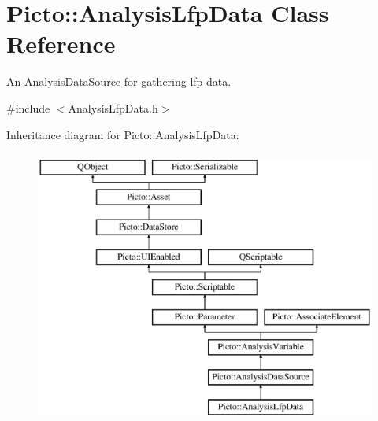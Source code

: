\hypertarget{class_picto_1_1_analysis_lfp_data}{\section{Picto\-:\-:Analysis\-Lfp\-Data Class Reference}
\label{class_picto_1_1_analysis_lfp_data}
}


An \hyperlink{class_picto_1_1_analysis_data_source}{Analysis\-Data\-Source} for gathering lfp data.  




{\ttfamily \#include $<$Analysis\-Lfp\-Data.\-h$>$}

Inheritance diagram for Picto\-:\-:Analysis\-Lfp\-Data\-:\begin{figure}[H]
\begin{center}
\leavevmode
\includegraphics[height=9.000000cm]{class_picto_1_1_analysis_lfp_data}
\end{center}
\end{figure}
